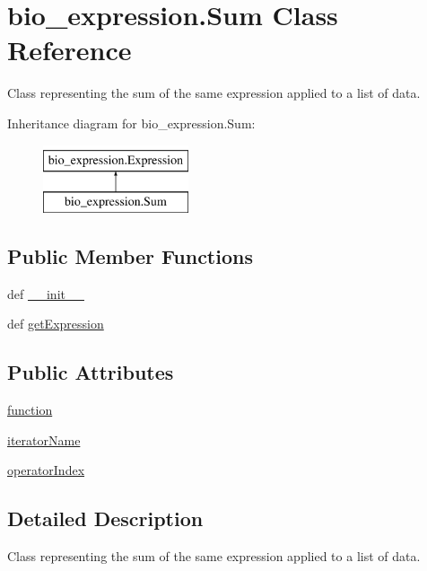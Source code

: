 \hypertarget{classbio__expression_1_1_sum}{\section{bio\+\_\+expression.\+Sum Class Reference}
\label{classbio__expression_1_1_sum}
}


Class representing the sum of the same expression applied to a list of data.  


Inheritance diagram for bio\+\_\+expression.\+Sum\+:\begin{figure}[H]
\begin{center}
\leavevmode
\includegraphics[height=2.000000cm]{d0/dde/classbio__expression_1_1_sum}
\end{center}
\end{figure}
\subsection*{Public Member Functions}
\begin{DoxyCompactItemize}
\item 
def \hyperlink{classbio__expression_1_1_sum_afc907480a976fc87d1dc0eef08dd7f82}{\+\_\+\+\_\+init\+\_\+\+\_\+}
\item 
def \hyperlink{classbio__expression_1_1_sum_a74a59ab9a188f737fc0c8a6296792cc2}{get\+Expression}
\end{DoxyCompactItemize}
\subsection*{Public Attributes}
\begin{DoxyCompactItemize}
\item 
\hyperlink{classbio__expression_1_1_sum_a9b0f02242bfe80afe341327f79388b87}{function}
\item 
\hyperlink{classbio__expression_1_1_sum_ad7a2c6824d64ea23672b11d9ca471f98}{iterator\+Name}
\item 
\hyperlink{classbio__expression_1_1_sum_a739503e877a65edff2e652623635c44d}{operator\+Index}
\end{DoxyCompactItemize}


\subsection{Detailed Description}
Class representing the sum of the same expression applied to a list of data. 

